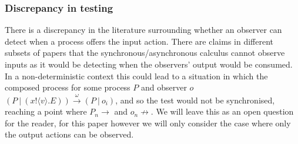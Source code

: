 \subsubsection{Discrepancy in testing} \label{discrepancy}
There is a discrepancy in the literature \cite{piThatStop} \cite{DBLP:conf/fossacs/BorealeNP99} \cite{10.1007/978-3-540-49382-2_9} \cite{castellan2019two} surrounding whether an observer can detect when a process offers the input action. There are claims in different subsets of papers that the synchronous/asynchronous calculus cannot observe inputs as it would be detecting when the observers' output would be consumed. In a non-deterministic context this could lead to a situation in which the composed process for some process $P$ and observer $o$ $(P \: | \: (x!\langle v \rangle.E)) \xrightarrow{\omega} (P \: | \: o_i)$, and so the test would not be synchronised, reaching a point where $P_n \rightarrow$ and $o_n \not \rightarrow$. We will leave this as an open question for the reader, for this paper however we will only consider the case where only the output actions can be observed.





